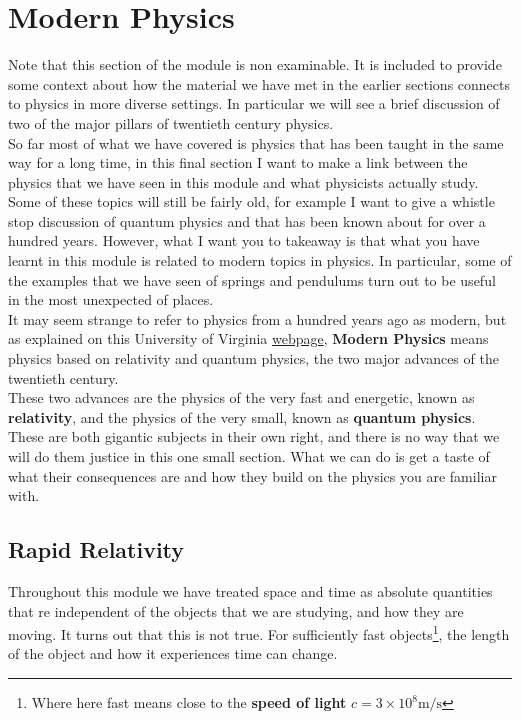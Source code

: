 \chapter{Modern Physics}
Note that this section of the module is non examinable. It is included to provide some context about how the material we have met in the earlier sections connects to physics in more diverse settings. In particular we will see a brief discussion of two of the major pillars of twentieth century physics.\\

So far most of what we have covered is physics that has been taught in the same way for a long time, in this final section I want to make a link between the physics that we have seen in this module and what physicists actually study. Some of these topics will still be fairly old, for example I want to give a whistle stop discussion of quantum physics and that has been known about for over a hundred years. However, what I want you to takeaway is that what you have learnt in this module is related to modern topics in physics. In particular, some of the examples that we have seen of springs and pendulums turn out to be useful in the most unexpected of places.\\

It may seem strange to refer to physics from a hundred years ago as modern, but as explained on this University of Virginia \href{https://galileo.phys.virginia.edu/classes/252/home.html}{webpage}, \textbf{Modern Physics} means physics based on relativity and quantum physics, the two major advances of the twentieth century.\\

These two advances are the physics of the very fast and energetic, known as \textbf{relativity}, and the physics of the very small, known as \textbf{quantum physics}. These are both gigantic subjects in their own right, and there is no way that we will do them justice in this one small section. What we can do is get a taste of what their consequences are and how they build on the physics you are familiar with.

\section{Rapid Relativity}
Throughout this module we have treated space and time as absolute quantities that re independent of the objects that we are studying, and how they are moving. It turns out that this is not true. For sufficiently fast objects\footnote{Where here fast means close to the \textbf{speed of light} $c=3\times10^{8}\text{m/s}$}, the length of the object and how it experiences time can change.\\

